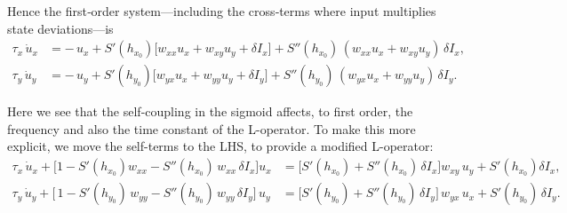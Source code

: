 Hence the first‐order system—including the cross‐terms where input multiplies state deviations—is
\[
\boxed{
\begin{aligned}
\tau_x\,\dot u_x 
&= -\,u_x 
+ S'(h_{x_0})\bigl[w_{xx}u_x + w_{xy}u_y + \delta I_x\bigr]
+ S''(h_{x_0})\,(w_{xx}u_x + w_{xy}u_y)\,\delta I_x,\\[0.7em]
\tau_y\,\dot u_y 
&= -\,u_y 
+ S'(h_{y_0})\bigl[w_{yx}u_x + w_{yy}u_y + \delta I_y\bigr]
+ S''(h_{y_0})\,(w_{yx}u_x + w_{yy}u_y)\,\delta I_y.
\end{aligned}
}
\]

Here we see that the self-coupling in the sigmoid affects, to first order, the frequency and also the time constant of the L-operator. To make this more explicit, we move the self-terms to the LHS, to provide a modified L-operator:
\[
\boxed{
\begin{aligned}
\tau_x\,\dot u_x + \bigl[1 -S'(h_{x_0}) w_{xx} - S''(h_{x_0})\,w_{xx} \,\delta I_x\bigr]u_x
&= 
\bigl[S'(h_{x_0}) + S''(h_{x_0})\,\delta I_x  \bigr]w_{xy}\, u_y + S'(h_{x_0})\delta I_x, \\[0.7em]
\tau_y\,\dot u_y 
+  \bigl[\,1 - S'(h_{y_0})\,w_{yy} - S''(h_{y_0})\,w_{yy}\,\delta I_y \bigr]\,u_y
&=
\bigl[S'(h_{y_0}) + S''(h_{y_0})\,\delta I_y\bigr]\,w_{yx}\,u_x 
+ S'(h_{y_0})\,\delta I_y.
\end{aligned}
}
\]

